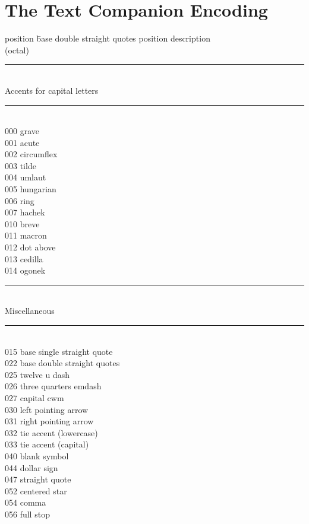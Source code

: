 \documentclass{article}
\renewcommand{\-}{\discretionary{\char'0177 }{}{}}
\begin{document}
\section{The Text Companion Encoding}

\begin{tabbing}
position \= base double straight quotes\kill
position \> description \\
(octal)  \>             \\
\rule{\linewidth}{.4pt}\>\\
Accents for capital letters\>\\
\rule{\linewidth}{.4pt}\>\\
000 \> grave \\
001 \> acute \\
002 \> circumflex\\
003 \> tilde \\
004 \> umlaut\\
005 \> hungarian \\
006 \> ring  \\
007 \> hachek\\
010 \> breve \\
011 \> macron\\
012 \> dot above \\
013 \> cedilla   \\
014 \> ogonek\\
\rule{\linewidth}{.4pt}\>\\
Miscellaneous\>\\
\rule{\linewidth}{.4pt}\>\\
015 \> base single straight quote\\
022 \> base double straight quotes\\
025 \> twelve u dash        \\
026 \> three quarters emdash\\
027 \> capital cwm\\
030 \> left pointing arrow  \\
031 \> right pointing arrow \\
032 \> tie accent (lowercase)\\
033  \> tie accent (capital) \\
040 \> blank symbol   \\
044 \> dollar sign\\
047 \> straight quote \\
052 \> centered star  \\
054 \> comma\\
056 \> full stop\\

\end{tabbing}
\end{document}
